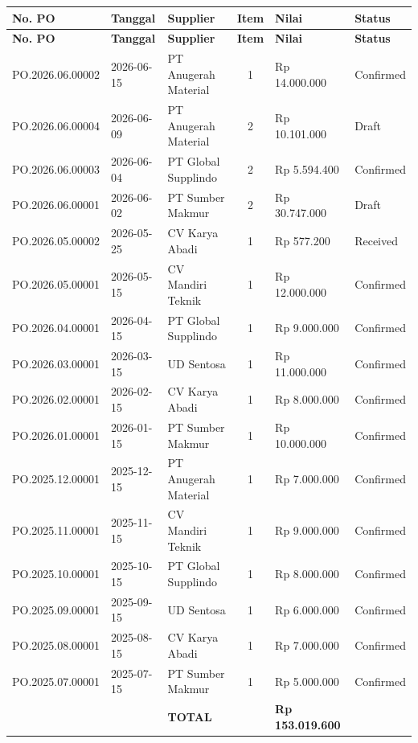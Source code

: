 \documentclass[11pt,a4paper]{article}
\begin{document}
{\setlength{\tabcolsep}{5pt}\small
\begin{longtable}{l l p{4cm} c R{2.6cm} l}
\toprule
\textbf{No. PO} & \textbf{Tanggal} & \textbf{Supplier} & \textbf{Item} & \textbf{Nilai} & \textbf{Status} \\
\midrule\endfirsthead
\toprule
\textbf{No. PO} & \textbf{Tanggal} & \textbf{Supplier} & \textbf{Item} & \textbf{Nilai} & \textbf{Status} \\
\midrule\endhead
\bottomrule\endfoot
PO.2026.06.00002 & 2026-06-15 & PT Anugerah Material & 1 & Rp 14.000.000 & Confirmed \\
PO.2026.06.00004 & 2026-06-09 & PT Anugerah Material & 2 & Rp 10.101.000 & Draft \\
PO.2026.06.00003 & 2026-06-04 & PT Global Supplindo & 2 & Rp 5.594.400 & Confirmed \\
PO.2026.06.00001 & 2026-06-02 & PT Sumber Makmur & 2 & Rp 30.747.000 & Draft \\
PO.2026.05.00002 & 2026-05-25 & CV Karya Abadi & 1 & Rp 577.200 & Received \\
PO.2026.05.00001 & 2026-05-15 & CV Mandiri Teknik & 1 & Rp 12.000.000 & Confirmed \\
PO.2026.04.00001 & 2026-04-15 & PT Global Supplindo & 1 & Rp 9.000.000 & Confirmed \\
PO.2026.03.00001 & 2026-03-15 & UD Sentosa & 1 & Rp 11.000.000 & Confirmed \\
PO.2026.02.00001 & 2026-02-15 & CV Karya Abadi & 1 & Rp 8.000.000 & Confirmed \\
PO.2026.01.00001 & 2026-01-15 & PT Sumber Makmur & 1 & Rp 10.000.000 & Confirmed \\
PO.2025.12.00001 & 2025-12-15 & PT Anugerah Material & 1 & Rp 7.000.000 & Confirmed \\
PO.2025.11.00001 & 2025-11-15 & CV Mandiri Teknik & 1 & Rp 9.000.000 & Confirmed \\
PO.2025.10.00001 & 2025-10-15 & PT Global Supplindo & 1 & Rp 8.000.000 & Confirmed \\
PO.2025.09.00001 & 2025-09-15 & UD Sentosa & 1 & Rp 6.000.000 & Confirmed \\
PO.2025.08.00001 & 2025-08-15 & CV Karya Abadi & 1 & Rp 7.000.000 & Confirmed \\
PO.2025.07.00001 & 2025-07-15 & PT Sumber Makmur & 1 & Rp 5.000.000 & Confirmed \\
 &  & \textbf{TOTAL} &  & \textbf{Rp 153.019.600} &  \\
\end{longtable}}
\end{document}
